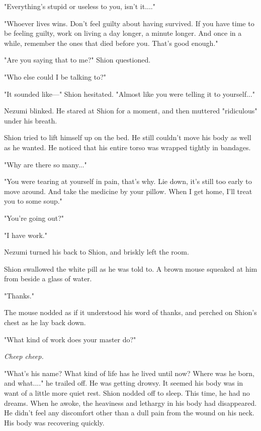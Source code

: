 "Everything's stupid or useless to you, isn't it...."~

"Whoever lives wins. Don't feel guilty about having survived. If you
have time to be feeling guilty, work on living a day longer, a minute
longer. And once in a while, remember the ones that died before you.
That's good enough."

"Are you saying that to me?" Shion questioned.

"Who else could I be talking to?"

"It sounded like---" Shion hesitated. "Almost like you were telling it to
yourself..."

Nezumi blinked. He stared at Shion for a moment, and then muttered
"ridiculous" under his breath.~

Shion tried to lift himself up on the bed. He still couldn't move his
body as well as he wanted. He noticed that his entire torso was wrapped
tightly in bandages.

"Why are there so many..."

"You were tearing at yourself in pain, that's why. Lie down, it's still
too early to move around. And take the medicine by your pillow. When I
get home, I'll treat you to some soup."

"You're going out?"

"I have work."

Nezumi turned his back to Shion, and briskly left the room.

Shion swallowed the white pill as he was told to. A brown mouse squeaked
at him from beside a glass of water.

"Thanks."

The mouse nodded as if it understood his word of thanks, and perched on
Shion's chest as he lay back down.

"What kind of work does your master do?"

\emph{Cheep cheep.}

"What's his name? What kind of life has he lived until now? Where was he
born, and what...." he trailed off. He was getting drowsy. It seemed his
body was in want of a little more quiet rest. Shion nodded off to sleep.
This time, he had no dreams. When he awoke, the heaviness and lethargy
in his body had disappeared. He didn't feel any discomfort other than a
dull pain from the wound on his neck. His body was recovering quickly.

